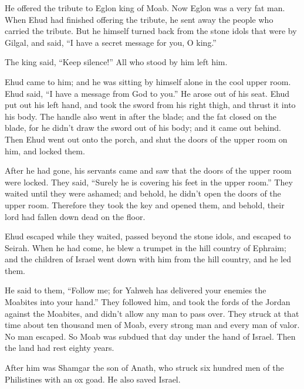 {He offered the tribute to Eglon king of Moab. Now Eglon was a very fat man.
When Ehud had finished offering the tribute, he sent away the people who carried the tribute.
But he himself turned back from the stone idols that were by Gilgal, and said, “I have a secret message for you, O king.”
\par }{\PP The king said, “Keep silence!” All who stood by him left him.
\par }{\PP {}Ehud came to him; and he was sitting by himself alone in the cool upper room. Ehud said, “I have a message from God to you.” He arose out of his seat.
Ehud put out his left hand, and took the sword from his right thigh, and thrust it into his body.
The handle also went in after the blade; and the fat closed on the blade, for he didn’t draw the sword out of his body; and it came out behind.
Then Ehud went out onto the porch, and shut the doors of the upper room on him, and locked them.
\par }{\PP {}After he had gone, his servants came and saw that the doors of the upper room were locked. They said, “Surely he is covering his feet in the upper room.”
They waited until they were ashamed; and behold, he didn’t open the doors of the upper room. Therefore they took the key and opened them, and behold, their lord had fallen down dead on the floor.
\par }{\PP {}Ehud escaped while they waited, passed beyond the stone idols, and escaped to Seirah.
When he had come, he blew a trumpet in the hill country of Ephraim; and the children of Israel went down with him from the hill country, and he led them.
\par }{\PP {}He said to them, “Follow me; for Yahweh has delivered your enemies the Moabites into your hand.” They followed him, and took the fords of the Jordan against the Moabites, and didn’t allow any man to pass over.
They struck at that time about ten thousand men of Moab, every strong man and every man of valor. No man escaped.
So Moab was subdued that day under the hand of Israel. Then the land had rest eighty years.
\par }{\PP {}After him was Shamgar the son of Anath, who struck six hundred men of the Philistines with an ox goad. He also saved Israel.

}
